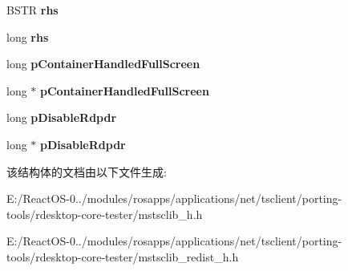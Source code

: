 \begin{DoxyCompactItemize}
B\+S\+TR {\bfseries rhs}
\item 
\mbox{\label{struct_i_ms_tsc_advanced_settings_vtbl_a3254a14c5c185d2cc8a5d66bab4492bd}} 
long {\bfseries rhs}
\item 
\mbox{\label{struct_i_ms_tsc_advanced_settings_vtbl_a5810134b3996488de0b5c34c42547b0e}} 
long {\bfseries p\+Container\+Handled\+Full\+Screen}
\item 
\mbox{\label{struct_i_ms_tsc_advanced_settings_vtbl_a1bfd92cd07c9981a8d0f8b7129d9d709}} 
long $\ast$ {\bfseries p\+Container\+Handled\+Full\+Screen}
\item 
\mbox{\label{struct_i_ms_tsc_advanced_settings_vtbl_a683cc633e4afcb300635655a5e0ea680}} 
long {\bfseries p\+Disable\+Rdpdr}
\item 
\mbox{\label{struct_i_ms_tsc_advanced_settings_vtbl_ad505c68dcecfba3fab82e82f74e57365}} 
long $\ast$ {\bfseries p\+Disable\+Rdpdr}
\end{DoxyCompactItemize}


该结构体的文档由以下文件生成\+:\begin{DoxyCompactItemize}
\item 
E\+:/\+React\+O\+S-\/0../modules/rosapps/applications/net/tsclient/porting-\/tools/rdesktop-\/core-\/tester/mstsclib\+\_\+h.\+h\item 
E\+:/\+React\+O\+S-\/0../modules/rosapps/applications/net/tsclient/porting-\/tools/rdesktop-\/core-\/tester/mstsclib\+\_\+redist\+\_\+h.\+h\end{DoxyCompactItemize}
